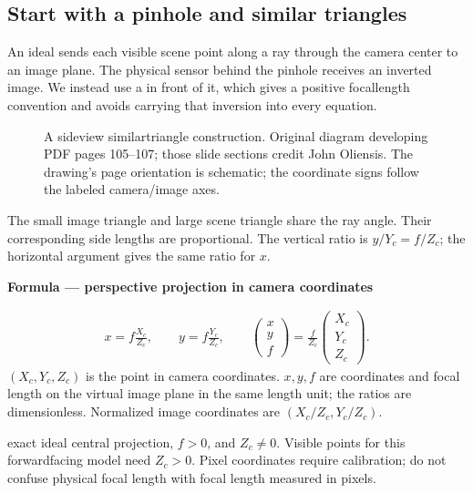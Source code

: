 \documentclass[letterpaper,11pt,english,openany,oneside]{jupyterBook}
\begin{document}
\subsection{Start with a pinhole and similar triangles}
\label{\detokenize{lectures/lecture01/cameras:start-with-a-pinhole-and-similar-triangles}}
\sphinxAtStartPar
An ideal  sends each visible scene point along a ray through the camera center to an image plane. The physical sensor behind the pinhole receives an inverted image. We instead use a  in front of it, which gives a positive focal\sphinxhyphen{}length convention and avoids carrying that inversion into every equation.

\begin{figure}[H]
\centering
\capstart

\noindent{}
\caption{A side\sphinxhyphen{}view similar\sphinxhyphen{}triangle construction. Original diagram developing PDF pages 105–107; those slide sections credit John Oliensis. The drawing’s page orientation is schematic; the coordinate signs follow the labeled camera/image axes.}\label{\detokenize{lectures/lecture01/cameras:fig-lec01-pinhole}}\end{figure}

\sphinxAtStartPar
The small image triangle and large scene triangle share the ray angle. Their corresponding side lengths are proportional. The vertical ratio is \(y/Y_c=f/Z_c\); the horizontal argument gives the same ratio for \(x\).

\begin{TextbookBox}
\textbf{Formula — perspective projection in camera coordinates}\par\smallskip
\begin{equation}\label{equation:lectures/lecture01/cameras:eq-lec01-pinhole}
\begin{split}x=f\frac{X_c}{Z_c},\qquad y=f\frac{Y_c}{Z_c},\qquad
\begin{pmatrix}x\\y\\f\end{pmatrix}
=\frac{f}{Z_c}\begin{pmatrix}X_c\\Y_c\\Z_c\end{pmatrix}.\end{split}
\end{equation}
\sphinxAtStartPar
\((X_c,Y_c,Z_c)\) is the point in camera coordinates. \(x,y,f\) are coordinates and focal length on the virtual image plane in the same length unit; the ratios are dimensionless. Normalized image coordinates are \((X_c/Z_c,Y_c/Z_c)\).

\sphinxAtStartPar
{} exact ideal central projection, \(f>0\), and \(Z_c\ne0\). Visible points for this forward\sphinxhyphen{}facing model need \(Z_c>0\). Pixel coordinates require calibration; do not confuse physical focal length with focal length measured in pixels.

\end{TextbookBox}
\end{document}
